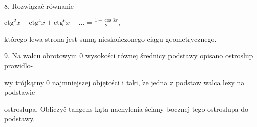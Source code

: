 \documentclass[a4paper,12pt]{article}
\begin{document}
8. Rozwiązač równanie

$\displaystyle \mathrm{c}\mathrm{t}\mathrm{g}^{2}x-\mathrm{c}\mathrm{t}\mathrm{g}^{4}x+\mathrm{c}\mathrm{t}\mathrm{g}^{6}x-\ldots=\frac{1+\cos 3x}{2},$

którego lewa strona jest sumą nieskończonego ciągu geometrycznego.

9. Na walcu obrotowym $0$ wysokości równej średnicy podstawy opisano ostroslup prawidlo-

wy trójkątny $0$ najmniejszej objętości $\mathrm{i}$ taki, $\dot{\mathrm{z}}\mathrm{e}$ jedna $\mathrm{z}$ podstaw walca $\mathrm{l}\mathrm{e}\dot{\mathrm{z}}\mathrm{y}$ na podstawie

ostrosłupa. Obliczyč tangens kąta nachylenia ściany bocznej tego ostroslupa do podstawy.
\end{document}
